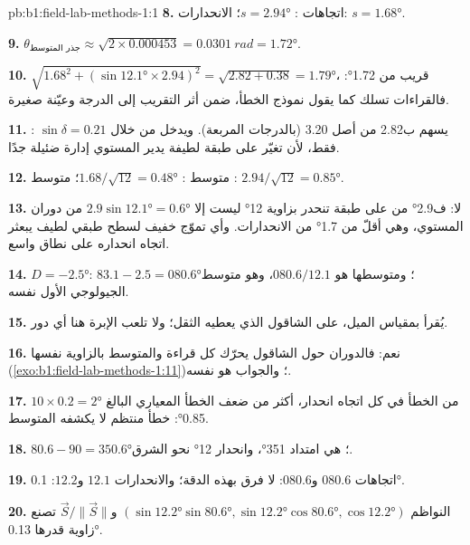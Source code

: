 \begin{solution}{pb:b1:field-lab-methods-1:1}
\textbf{8.} اتجاهات : $s = \ang{2.94}$؛ الانحدارات: $s = \ang{1.68}$.

\textbf{9.} $\theta_{\text{جذر المتوسط}} \approx \sqrt{2\times0.000453} =
\qty{0.0301}{rad} = \ang{1.72}$.

\textbf{10.} $\sqrt{1.68^2 + (\sin\ang{12.1}\times2.94)^2} = \sqrt{2.82 +
0.38} = \ang{1.79}$، قريب من \ang{1.72}: فالقراءات تسلك كما يقول نموذج الخطأ، ضمن أثر التقريب إلى الدرجة وعيّنة صغيرة.

\textbf{11.} : يسهم ب2.82 من أصل 3.20 (بالدرجات المربعة). ويدخل  من خلال $\sin\delta = 0.21$ فقط، لأن تغيّر  على طبقة لطيفة يدير المستوي إدارة ضئيلة جدًا.

\textbf{12.} متوسط : $1.68/\sqrt{12} = \ang{0.48}$؛ متوسط :
$2.94/\sqrt{12} = \ang{0.85}$.

\textbf{13.} لا: ف\ang{2.9} من  على طبقة تنحدر بزاوية \ang{12} ليست إلا
$2.9\sin\ang{12.1} = \ang{0.6}$ من دوران المستوي، وهي أقلّ من \ang{1.7} من الانحدارات. وأي تموّج خفيف لسطح طبقي لطيف يبعثر اتجاه انحداره على نطاق واسع.

\textbf{14.} $D = \ang{-2.5}$: $83.1 - 2.5 = \ang{080.6}$؛ ومتوسطها هو
$080.6/12.1$، وهو متوسط الجيولوجي الأول نفسه.

\textbf{15.} يُقرأ  بمقياس الميل، على الشاقول الذي يعطيه الثقل؛ ولا تلعب الإبرة هنا أي دور.

\textbf{16.} نعم: فالدوران حول الشاقول يحرّك كل قراءة والمتوسط بالزاوية نفسها (\cref{exo:b1:field-lab-methods-1:11})؛ والجواب هو نفسه.

\textbf{17.} $10\times0.2 = \ang{2}$ من الخطأ في كل اتجاه انحدار، أكثر من ضعف الخطأ المعياري البالغ \ang{0.85}: خطأ منتظم لا يكشفه المتوسط.

\textbf{18.} $80.6 - 90 = \ang{350.6}$؛  هي امتداد \ang{351}، وانحدار \ang{12} نحو الشرق.

\textbf{19.} اتجاهات  $080.6$ و$080.6$: لا فرق بهذه الدقة؛ والانحدارات $12.1$ و$12.2$: \ang{0.1}.

\textbf{20.} النواظم $(\sin\ang{12.2}\sin\ang{80.6},
\sin\ang{12.2}\cos\ang{80.6}, \cos\ang{12.2})$ و$\vec S/\|\vec S\|$ تصنع زاوية قدرها \ang{0.13}.


\end{solution}
